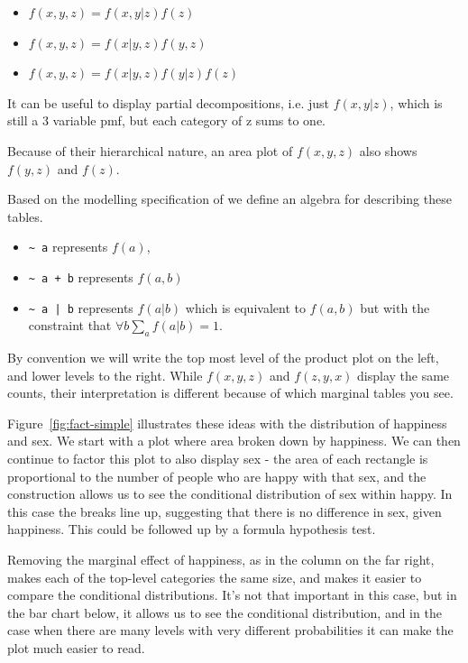 \documentclass[letterpaper,oneside]{scrartcl}
\begin{document}
\begin{itemize}
  \item $f(x, y, z) = f(x, y | z) f(z)$
  \item $f(x, y, z) = f(x | y, z) f(y, z)$
  \item $f(x, y, z) = f(x | y, z) f(y | z) f(z)$
\end{itemize}

It can be useful to display partial decompositions, i.e. just $f(x, y | z)$, which is still a 3 variable pmf, but each category of z sums to one.

Because of their hierarchical nature, an area plot of $f(x, y, z)$ also shows $f(y, z)$ and $f(z)$.  

Based on the modelling specification of \citep{wilkinson:1973} we define an algebra for describing these tables.  

\begin{itemize}
  \item \verb|~ a| represents $f(a)$,
  \item \verb|~ a + b| represents $f(a, b)$
  \item \verb!~ a | b! represents $f(a | b)$ which is equivalent to $f(a, b)$ but with the constraint that $\forall b \sum_a f(a | b) = 1$.
\end{itemize}

By convention we will write the top most level of the product plot on the left, and lower levels to the right.  While $f(x, y, z)$ and $f(z, y, x)$ display the same counts, their interpretation is different because of which marginal tables you see.

Figure~\ref{fig:fact-simple} illustrates these ideas with the distribution of happiness and sex. We start with a plot where area broken down by happiness. We can then continue to factor this plot to also display sex - the area of each rectangle is proportional to the number of people who are happy with that sex, and the construction allows us to see the conditional distribution of sex within happy. In this case the breaks line up, suggesting that there is no difference in sex, given happiness.  This could be followed up by a formula hypothesis test.

Removing the marginal effect of happiness, as in the column on the far right, makes each of the top-level categories the same size, and makes it easier to compare the conditional distributions.  It's not that important in this case, but in the bar chart below, it allows us to see the conditional distribution, and in the case when there are many levels with very different probabilities it can make the plot much easier to read.
\end{document}
